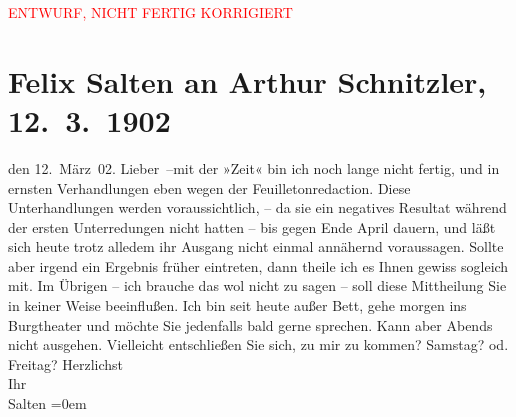 
\begin{center}
            \textcolor{red}{ENTWURF, NICHT FERTIG KORRIGIERT}
                      \end{center}
            
         \renewcommand{\erwaehnteInstitutionen}{Institutionen: Die Zeit}
         \renewcommand{\erwaehnteOrte}{Orte: Burgtheater, Wien}
         \renewcommand{\erwaehnteWerke}{}
               \section[Felix Salten an Arthur Schnitzler, 12. 3. 1902]{ Felix Salten an Arthur Schnitzler, 12. 3. 1902}\nopagebreak{}\rehead{ }\begin{ledgroupsized}[t]{13cm}\normalsize\beginnumbering \toendnotes[C]{\smallbreak\pagebreak[2]} 
\toendnotes[C]{\smallbreak}\pstart
           \raggedleft{}{\pb}den
                  12. März 02. \pend
           \pstart
           Lieber –mit der »Zeit« bin ich
               noch lange nicht fertig, und in ernsten Verhandlungen eben wegen der
               Feuilletonredaction. Diese Unterhandlungen werden voraussichtlich, – da sie ein
               negatives Resultat während der ersten Unterredungen nicht hatten – bis gegen Ende
               April dauern, und läßt sich heute trotz alledem ihr Ausgang nicht einmal annähernd
               voraussagen. Sollte aber irgend ein Ergebnis früher eintreten, dann theile ich es
               Ihnen gewiss sogleich mit. Im Übrigen – ich brauche das wol nicht zu sagen – soll
               diese Mittheilung Sie in keiner Weise beeinflußen.\pend
           \pstart
           Ich bin seit heute außer Bett, gehe morgen ins Burgtheater und möchte Sie jedenfalls bald gerne sprechen. Kann aber Abends
               nicht ausgehen.\pend
           \pstart
           Vielleicht entschließen Sie sich, \label{K_L03326-1v}\label{K_L03326-1h} zu
               mir zu kommen? Samstag? od. Freitag? \pend
           \pstart
           Herzlichst {\\[\baselineskip]}Ihr {\\[\baselineskip]}\spacefill\mbox{Salten}\pend
           \leftskip=0em{}
         
         \endnumbering{}\end{ledgroupsized}\begin{anhang}\end{anhang}\newcommand{\dateiname}{L03326}\newcommand{\titel}{Felix Salten an Arthur Schnitzler, 12. 3. 1902}\newcommand{\editorInnen}{Martin Anton Müller und Laura Untner}
      